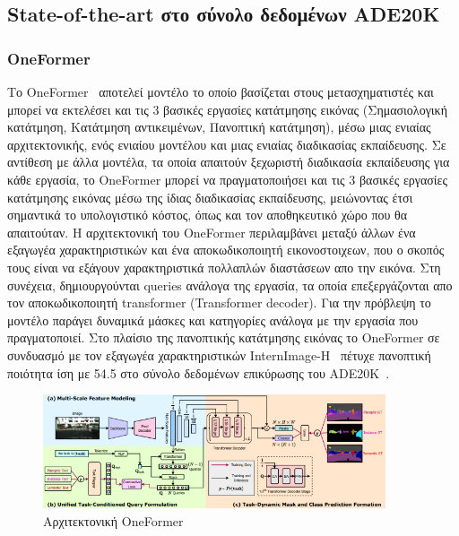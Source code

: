 \documentclass[12pt]{article}
\numberwithin{equation}{section}
\begin{document}
\subsection{State-of-the-art στο σύνολο δεδομένων ADE20K}

\subsubsection{OneFormer}

Το OneFormer~\cite{jain2022oneformertransformerruleuniversal} αποτελεί μοντέλο το οποίο βασίζεται στους μετασχηματιστές και μπορεί να εκτελέσει και τις 3 βασικές εργασίες κατάτμησης εικόνας (Σημασιολογική κατάτμηση, Κατάτμηση αντικειμένων, Πανοπτική κατάτμηση), μέσω μιας ενιαίας αρχιτεκτονικής, ενός ενιαίου μοντέλου και μιας ενιαίας διαδικασίας εκπαίδευσης. Σε αντίθεση με άλλα μοντέλα, τα οποία απαιτούν ξεχωριστή διαδικασία εκπαίδευσης για κάθε εργασία, το OneFormer μπορεί να πραγματοποιήσει και τις 3 βασικές εργασίες κατάτμησης εικόνας μέσω της ίδιας διαδικασίας εκπαίδευσης, μειώνοντας έτσι σημαντικά το υπολογιστικό κόστος, όπως και τον αποθηκευτικό χώρο που θα απαιτούταν. Η αρχιτεκτονική του OneFormer περιλαμβάνει μεταξύ άλλων ένα εξαγωγέα χαρακτηριστικών και ένα αποκωδικοποιητή εικονοστοιχεων, που ο σκοπός τους είναι να εξάγουν χαρακτηριστικά πολλαπλών διαστάσεων απο την εικόνα. Στη συνέχεια, δημιουργούνται queries ανάλογα της εργασία, τα οποία επεξεργάζονται απο τον αποκωδικοποιητή transformer (Transformer decoder). Για την πρόβλεψη το μοντέλο παράγει δυναμικά μάσκες και κατηγορίες ανάλογα με την εργασία που πραγματοποιεί. Στο πλαίσιο της πανοπτικής κατάτμησης εικόνας το OneFormer σε συνδυασμό με τον εξαγωγέα χαρακτηριστικών InternImage-H~\cite{wang2023internimageexploringlargescalevision} πέτυχε πανοπτική ποιότητα ίση με 54.5 στο σύνολο δεδομένων επικύρωσης του ADE20K~\cite{zhou2018semanticunderstandingscenesade20k}.\\

\begin{figure}[h!]
  \centering
  \includegraphics[width=0.9\textwidth]{images/OneFormer.png} %
  \caption{Αρχιτεκτονική OneFormer}
  \label{figure 20}
\end{figure} 
\end{document}
